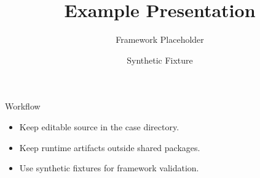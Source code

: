 \documentclass{beamer}
\title{Example Presentation}
\author{Framework Placeholder}
\date{Synthetic Fixture}
\begin{document}
\begin{frame}
  \label{slide:title}
  \titlepage
\end{frame}

\begin{frame}{Workflow}
  \label{slide:workflow}
  \begin{itemize}
    \item Keep editable source in the case directory.
    \item Keep runtime artifacts outside shared packages.
    \item Use synthetic fixtures for framework validation.
  \end{itemize}
\end{frame}
\end{document}
